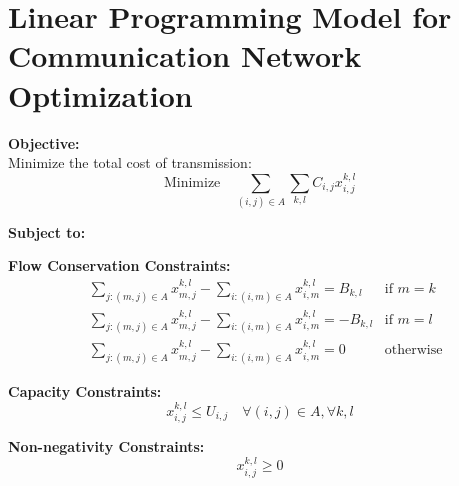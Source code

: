 \documentclass{article}
\begin{document}
\section*{Linear Programming Model for Communication Network Optimization}

\textbf{Objective:} \\
Minimize the total cost of transmission:
\begin{equation}
\text{Minimize} \quad \sum_{(i,j) \in A} \sum_{k,l} C_{i,j} x_{i,j}^{k,l}
\end{equation}

\textbf{Subject to:}

\textbf{Flow Conservation Constraints:}
\begin{align}
&\sum_{j: (m,j) \in A} x_{m,j}^{k,l} - \sum_{i: (i,m) \in A} x_{i,m}^{k,l} = B_{k,l}  & \text{if } m = k \\ 
&\sum_{j: (m,j) \in A} x_{m,j}^{k,l} - \sum_{i: (i,m) \in A} x_{i,m}^{k,l} = -B_{k,l} & \text{if } m = l \\ 
&\sum_{j: (m,j) \in A} x_{m,j}^{k,l} - \sum_{i: (i,m) \in A} x_{i,m}^{k,l} = 0  & \text{otherwise} 
\end{align}

\textbf{Capacity Constraints:}
\begin{equation}
x_{i,j}^{k,l} \leq U_{i,j} \quad \forall (i,j) \in A, \forall k, l
\end{equation}

\textbf{Non-negativity Constraints:}
\begin{equation}
x_{i,j}^{k,l} \geq 0
\end{equation}
\end{document}
